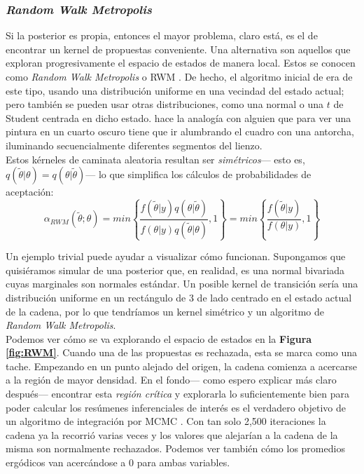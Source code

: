 \subsubsection*{\textit{Random Walk Metropolis}}

Si la posterior es propia, entonces el mayor problema, claro está, es el de encontrar un kernel de propuestas conveniente. Una alternativa son aquellos que exploran progresivamente el espacio de estados de manera local. Estos se conocen como \textit{Random Walk Metropolis} o RWM \parencite{RobertCasella10}. De hecho, el algoritmo inicial de \textcite{Metropolis53} era de este tipo, usando una distribución uniforme en una vecindad del estado actual; pero también se pueden usar otras distribuciones, como una normal o una $t$ de Student centrada en dicho estado. \textcite{Robert15} hace la analogía con alguien que para ver una pintura en un cuarto oscuro tiene que ir alumbrando el cuadro con una antorcha, iluminando secuencialmente diferentes segmentos del lienzo.\\

Estos kérneles de caminata aleatoria resultan ser \textit{simétricos}--- esto es,  $q(\tilde{\theta}|\theta) = q(\theta |\tilde{\theta})$--- lo que simplifica los cálculos de probabilidades de aceptación:
\begin{equation*}
\alpha_{RWM}(\tilde{\theta};\theta)=min\left\lbrace\dfrac{f(\tilde{\theta}|y)q(\theta|\tilde{\theta})}{f(\theta|y)q(\tilde{\theta}|\theta)},1\right\rbrace = min\left\lbrace\dfrac{f(\tilde{\theta}|y)}{f(\theta|y)},1\right\rbrace
\end{equation*}

Un ejemplo trivial puede ayudar a visualizar cómo funcionan. Supongamos que quisiéramos simular de una posterior que, en realidad, es una normal bivariada cuyas marginales son normales estándar. Un posible kernel de transición sería una distribución uniforme en un rectángulo de $3$ de lado centrado en el estado actual de la cadena, por lo que tendríamos un kernel simétrico y un algoritmo de \textit{Random Walk Metropolis}.\\ 

Podemos ver cómo se va explorando el espacio de estados en la \textbf{Figura \ref{fig:RWM}}. Cuando una de las propuestas es rechazada, esta se marca como una tache. Empezando en un punto alejado del origen, la cadena comienza a acercarse a la región de mayor densidad. En el fondo--- como espero explicar más claro después--- encontrar esta \textit{región crítica} y explorarla lo suficientemente bien para poder calcular los resúmenes inferenciales de interés es el verdadero objetivo de un algoritmo de integración por MCMC \parencites{Neal93,Betancourt17}. Con tan solo 2,500 iteraciones la cadena ya la recorrió varias veces y los valores que alejarían a la cadena de la misma son normalmente rechazados. Podemos ver también cómo los promedios ergódicos van acercándose a $0$ para ambas variables.\\

